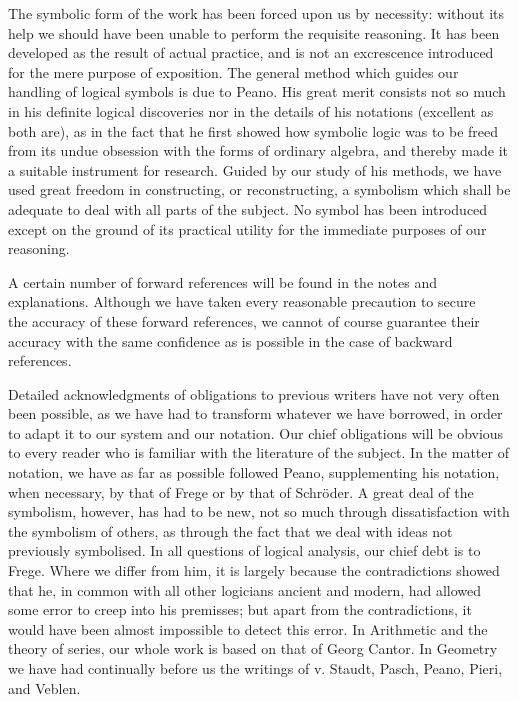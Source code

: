 \documentclass[10pt]{article}
\begin{document}
The symbolic form of the work has been forced upon us by necessity: without its help we should have been unable to perform the requisite reasoning. It has been developed as the result of actual practice, and is not an excrescence introduced for the mere purpose of exposition. The general method which guides our handling of logical symbols is due to Peano. His great merit consists not so much in his definite logical discoveries nor in the details of his notations (excellent as both are), as in the fact that he first showed how symbolic logic was to be freed from its undue obsession with the forms of ordinary algebra, and thereby made it a suitable instrument for research. Guided by our study of his methods, we have used great freedom in constructing, or reconstructing, a symbolism which shall be adequate to deal with all parts of the subject. No symbol has been introduced except on the ground of its practical utility for the immediate purposes of our reasoning.

A certain number of forward references will be found in the notes and explanations. Although we have taken every reasonable precaution to secure\\
the accuracy of these forward references, we cannot of course guarantee their accuracy with the same confidence as is possible in the case of backward references.

Detailed acknowledgments of obligations to previous writers have not very often been possible, as we have had to transform whatever we have borrowed, in order to adapt it to our system and our notation. Our chief obligations will be obvious to every reader who is familiar with the literature of the subject. In the matter of notation, we have as far as possible followed Peano, supplementing his notation, when necessary, by that of Frege or by that of Schröder. A great deal of the symbolism, however, has had to be new, not so much through dissatisfaction with the symbolism of others, as through the fact that we deal with ideas not previously symbolised. In all questions of logical analysis, our chief debt is to Frege. Where we differ from him, it is largely because the contradictions showed that he, in common with all other logicians ancient and modern, had allowed some error to creep into his premisses; but apart from the contradictions, it would have been almost impossible to detect this error. In Arithmetic and the theory of series, our whole work is based on that of Georg Cantor. In Geometry we have had continually before us the writings of v. Staudt, Pasch, Peano, Pieri, and Veblen.
\end{document}
